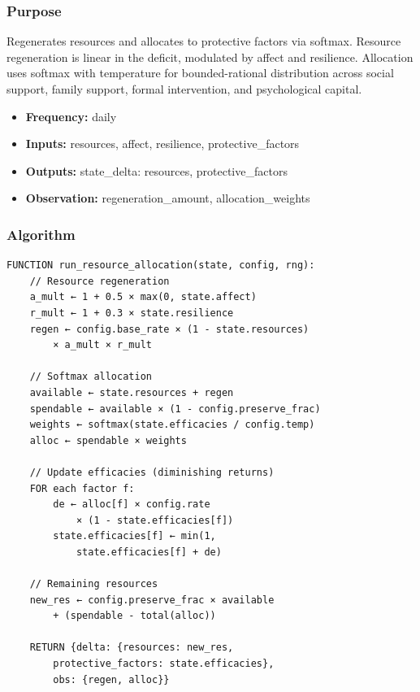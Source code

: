 \documentclass[
  letterpaper,
  DIV=11,
  numbers=noendperiod]{scrartcl}
\providecommand{\tightlist}{%
  \setlength{\itemsep}{0pt}\setlength{\parskip}{0pt}}
\begin{document}
\subsubsection{Purpose}\label{purpose-6}

Regenerates resources and allocates to protective factors via softmax.
Resource regeneration is linear in the deficit, modulated by affect and
resilience. Allocation uses softmax with temperature for
bounded-rational distribution across social support, family support,
formal intervention, and psychological capital.

\begin{itemize}
\tightlist
\item
  \textbf{Frequency:} daily
\item
  \textbf{Inputs:} resources, affect, resilience, protective\_factors
\item
  \textbf{Outputs:} state\_delta: resources, protective\_factors
\item
  \textbf{Observation:} regeneration\_amount, allocation\_weights
\end{itemize}

\subsubsection{Algorithm}\label{algorithm-4}

\begin{verbatim}
FUNCTION run_resource_allocation(state, config, rng):
    // Resource regeneration
    a_mult ← 1 + 0.5 × max(0, state.affect)
    r_mult ← 1 + 0.3 × state.resilience
    regen ← config.base_rate × (1 - state.resources)
        × a_mult × r_mult

    // Softmax allocation
    available ← state.resources + regen
    spendable ← available × (1 - config.preserve_frac)
    weights ← softmax(state.efficacies / config.temp)
    alloc ← spendable × weights

    // Update efficacies (diminishing returns)
    FOR each factor f:
        de ← alloc[f] × config.rate
            × (1 - state.efficacies[f])
        state.efficacies[f] ← min(1,
            state.efficacies[f] + de)

    // Remaining resources
    new_res ← config.preserve_frac × available
        + (spendable - total(alloc))

    RETURN {delta: {resources: new_res,
        protective_factors: state.efficacies},
        obs: {regen, alloc}}
\end{verbatim}
\end{document}
